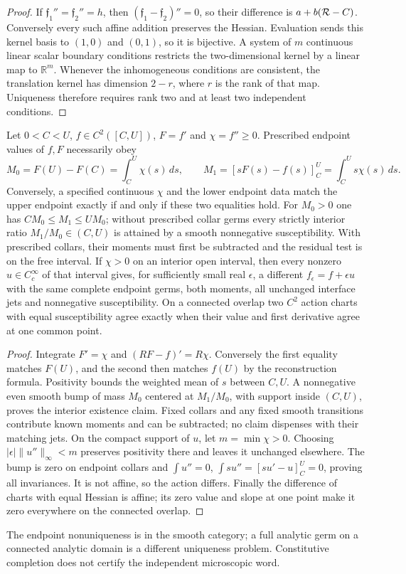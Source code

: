 \documentclass[12pt,a4paper]{article}
\begin{document}
\begin{proof}
If \(\mathfrak f_1''=\mathfrak f_2''=h\), then
\((\mathfrak f_1-\mathfrak f_2)''=0\), so their difference is
\(a+b(\mathcal R-C)\).  Conversely every such affine addition preserves the
Hessian.  Evaluation sends this kernel basis to \((1,0)\) and \((0,1)\), so
it is bijective.  A system of \(m\) continuous linear scalar boundary
conditions restricts the two-dimensional kernel by a linear map to
\(\mathbb R^m\).  Whenever the inhomogeneous conditions are consistent, the
translation kernel has dimension \(2-r\), where \(r\) is the rank of that
map.  Uniqueness therefore requires rank two and at least two independent
conditions.
\end{proof}

\begin{theorem}
\label{p3e:thm:v2217-uv-ir-moment-nonuniqueness}
Let $0<C<U$, $f\in C^2([C,U])$, $F=f'$ and $\chi=f''\ge0$.
Prescribed endpoint values of $f,F$ necessarily obey
\[
 M_0=F(U)-F(C)=\int_C^U\chi(s)\,ds,\qquad
 M_1=[sF(s)-f(s)]_C^U=\int_C^U s\chi(s)\,ds.
\]
Conversely, a specified continuous $\chi$ and the lower endpoint data
match the upper endpoint exactly if and only if these two equalities hold.
For $M_0>0$ one has $CM_0\le M_1\le UM_0$; without prescribed collar
germs every strictly interior ratio $M_1/M_0\in(C,U)$ is attained by a
smooth nonnegative susceptibility. With prescribed collars, their moments
must first be subtracted and the residual test is on the free interval.
If $\chi>0$ on an interior open interval, then every nonzero
$u\in C_c^\infty$ of that interval gives, for sufficiently small real
$\epsilon$, a different $f_\epsilon=f+\epsilon u$ with the same complete
endpoint germs, both moments, all unchanged interface jets and nonnegative
susceptibility. On a connected overlap two $C^2$ action charts with equal
susceptibility agree exactly when their value and first derivative agree
at one common point.
\end{theorem}
\begin{proof}
Integrate $F'=\chi$ and $(RF-f)'=R\chi$. Conversely the first equality
matches $F(U)$, and the second then matches $f(U)$ by the reconstruction
formula. Positivity bounds the weighted mean of $s$ between $C,U$.
A nonnegative even smooth bump of mass $M_0$ centered at $M_1/M_0$,
with support inside $(C,U)$, proves the interior existence claim. Fixed
collars and any fixed smooth transitions contribute known moments and can
be subtracted; no claim dispenses with their matching jets.
On the compact support of $u$, let $m=\min\chi>0$. Choosing
$|\epsilon|\|u''\|_\infty<m$ preserves positivity there and leaves it
unchanged elsewhere. The bump is zero on endpoint collars and
$\int u''=0$, $\int s u''=[su'-u]_C^U=0$, proving all invariances.
It is not affine, so the action differs. Finally the difference of charts
with equal Hessian is affine; its zero value and slope at one point make
it zero everywhere on the connected overlap.
\end{proof}
The endpoint nonuniqueness is in the smooth category; a full analytic germ
on a connected analytic domain is a different uniqueness problem.
Constitutive completion does not certify the independent microscopic word.
\end{document}
